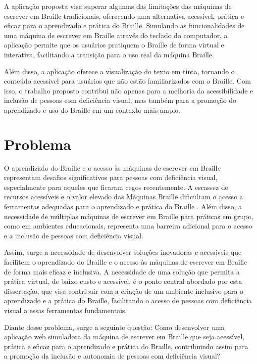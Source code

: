 A aplicação proposta visa superar algumas das limitações das máquinas de escrever em Braille tradicionais, oferecendo uma alternativa acessível, prática e eficaz para o aprendizado e prática do Braille. Simulando as funcionalidades de uma máquina de escrever em Braille através do teclado do computador, a aplicação permite que os usuários pratiquem o Braille de forma virtual e interativa, facilitando a transição para o uso real da máquina Braille.

Além disso, a aplicação oferece a visualização do texto em tinta, tornando o conteúdo acessível para usuários que não estão familiarizados com o Braille. Com isso, o trabalho proposto contribui não apenas para a melhoria da acessibilidade e inclusão de pessoas com deficiência visual, mas também para a promoção do aprendizado e uso do Braille em um contexto mais amplo.

\section{Problema}

O aprendizado do Braille e o acesso às máquinas de escrever em Braille representam desafios significativos para pessoas com deficiência visual, especialmente para aqueles que ficaram cegos recentemente. A escassez de recursos acessíveis e o valor elevado das Máquinas Braille dificultam o acesso a ferramentas adequadas para o aprendizado e prática do Braille \parencite{REF01}. Além disso, a necessidade de múltiplas máquinas de escrever em Braille para práticas em grupo, como em ambientes educacionais, representa uma barreira adicional para o acesso e a inclusão de pessoas com deficiência visual.

Assim, surge a necessidade de desenvolver soluções inovadoras e acessíveis que facilitem o aprendizado do Braille e o acesso às máquinas de escrever em Braille de forma mais eficaz e inclusiva. A necessidade de uma solução que permita a prática virtual, de baixo custo e acessível, é o ponto central abordado por esta dissertação, que visa contribuir com a criação de um ambiente inclusivo para o aprendizado e a prática do Braille, facilitando o acesso de pessoas com deficiência visual a essas ferramentas fundamentais.

Diante desse problema, surge a seguinte questão: Como desenvolver uma aplicação web simuladora da máquina de escrever em Braille que seja acessível, prática e eficaz para o aprendizado e prática do Braille, contribuindo assim para a promoção da inclusão e autonomia de pessoas com deficiência visual?




